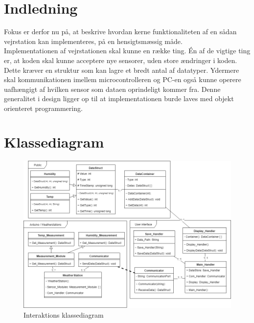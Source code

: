 
\section{Indledning}
Fokus er derfor nu på, at beskrive hvordan kerne funktionaliteten af en sådan vejrstation kan implementeres, på en hensigtsmæssig måde.\\
Implementationen af vejrstationen skal kunne en række ting. Én af de vigtige ting er, at koden skal kunne acceptere nye sensorer, uden store ændringer i koden. Dette kræver en struktur som kan lagre et bredt antal af datatyper. Ydermere skal kommunikationen imellem microcontrolleren og PC-en også kunne operere uafhængigt af hvilken sensor som dataen oprindeligt kommer fra. Denne generalitet i design ligger op til at implementationen burde laves med objekt orienteret programmering. 

\section{Klassediagram}
\begin{figure}[H]
    \centering
    \includegraphics[width=1\textwidth, angle =0]{Struktureret_System_Udvikling/Workshop_2/Assets/Workshop2_ClassDiagram.png}
    \caption{Interaktions klassediagram}
    \label{fig:classdiagram}
\end{figure}

